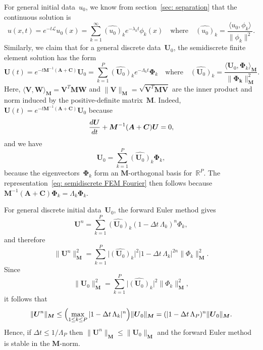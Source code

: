 For general initial data~$u_0$, we know from section~\ref{sec: separation} 
that the continuous solution is
\[
u(x,t)=e^{-t\mathcal{L}}u_0(x)
    =\sum_{k=1}^\infty\widehat{(u_0)}_k e^{-\lambda_kt}\phi_k(x)
\quad\text{where}\quad
\widehat{(u_0)}_k=\frac{\langle u_0,\phi_k\rangle}{\|\phi_k\|^2}.
\]
Similarly, we claim that for a general discrete
data~$\boldsymbol{U}_0$, the semidiscrete finite element solution has the form
\begin{equation}\label{eq: semidiscrete FEM Fourier}
\boldsymbol{U}(t)=e^{-t\boldsymbol{M}^{-1}(\boldsymbol{A}+\boldsymbol{C})}
    \boldsymbol{U}_0
    =\sum_{k=1}^P\widehat{(\boldsymbol{U}_0)}_k e^{-\Lambda_kt}
    \boldsymbol{\Phi}_k
\quad\text{where}\quad
\widehat{(\boldsymbol{U}_0)}_k
=\frac{\langle\boldsymbol{U}_0,\boldsymbol{\Phi}_k\rangle_{\boldsymbol{M}}}%
{\|\boldsymbol{\Phi_k}\|_{\boldsymbol{M}}^2}.
\end{equation}
Here, $\langle\boldsymbol{V},\boldsymbol{W}\rangle_{\boldsymbol{M}}
=\boldsymbol{V}^T\boldsymbol{M}\boldsymbol{W}$ and 
$\|\boldsymbol{V}\|_{\boldsymbol{M}}
=\sqrt{\boldsymbol{V}^T\boldsymbol{M}\boldsymbol{V}}$ are the inner product and 
norm induced by the positive-definite matrix~$\boldsymbol{M}$.  Indeed, 
$\boldsymbol{U}(t)=e^{-t\boldsymbol{M}^{-1}(\boldsymbol{A}+\boldsymbol{C})}
\boldsymbol{U}_0$ because
\[
\frac{d\boldsymbol{U}}{dt}+\boldsymbol{M}^{-1}(\boldsymbol{A}+\boldsymbol{C})
\boldsymbol{U}=\boldmath{0},
\]
and we have
\[
\boldsymbol{U}_0=\sum_{k=1}^P\widehat{(\boldsymbol{U}_0)}_k\boldsymbol{\Phi}_k,
\]
because the eigenvectors~$\boldsymbol{\Phi}_k$ form an 
$\boldsymbol{M}$-orthogonal basis for~$\mathbb{R}^P$.  The 
representation~\eqref{eq: semidiscrete FEM Fourier} then follows because
$\boldsymbol{M}^{-1}(\boldsymbol{A}+\boldsymbol{C})\boldsymbol{\Phi}_k
=\Lambda_k\boldsymbol{\Phi}_k$.

\begin{example}\label{example: forward Euler FEM}
For general discrete initial data~$\boldsymbol{U}_0$, the forward Euler method 
gives
\[
\boldsymbol{U}^n=\sum_{k=1}^P\widehat{(\boldsymbol{U}_0)}_k 
    (1-\Delta t\,\Lambda_k)^n\Phi_k,
\]
and therefore
\[
\|\boldsymbol{U}^n\|_{\boldsymbol{M}}^2
    =\sum_{k=1}^P\bigl|\widehat{(\boldsymbol{U}_0)}_k\bigr|^2
    |1-\Delta t\,\Lambda_k|^{2n}\|\Phi_k\|_{\boldsymbol{M}}^2.
\]
Since
\[
\|\boldsymbol{U}_0\|_{\boldsymbol{M}}^2
    =\sum_{k=1}^P\bigl|\widehat{(\boldsymbol{U}_0)}_k\bigr|^2
    \|\Phi_k\|_{\boldsymbol{M}}^2,
\]
it follows that
\[
\|\boldsymbol{U}^n\|_{\boldsymbol{M}}
    \le\Bigl(\max_{1\le k\le P}|1-\Delta t\,\Lambda_k|^n\Bigr)
    \|\boldsymbol{U}_0\|_{\boldsymbol{M}}
	=(|1-\Delta t\,\Lambda_P)^n\|\boldsymbol{U}_0\|_{\boldsymbol{M}}.
\]
Hence, if $\Delta t\le 1/\Lambda_P$ then $\|\boldsymbol{U}^n\|_{\boldsymbol{M}}
\le\|\boldsymbol{U}_0\|_{\boldsymbol{M}}$ and the forward Euler method is 
stable in the $\boldsymbol{M}$-norm.
\end{example}

